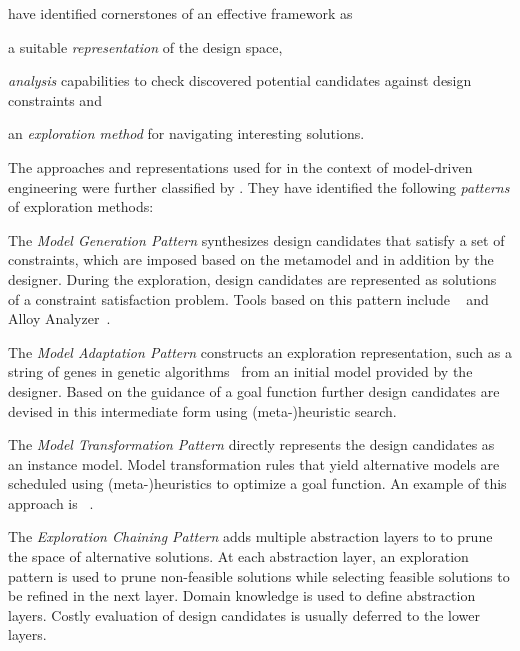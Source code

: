 \citet{Kang10effective} have identified cornerstones of an effective  framework as
\begin{inparaenum}
\item a suitable \emph{representation} of the design space,
\item \emph{analysis} capabilities to check discovered potential candidates against design constraints and
\item an \emph{exploration method} for navigating interesting solutions.
\end{inparaenum}
The approaches and representations used for  in the context of model-driven engineering were further classified by \citet{Vanherpen14patterns}. They have identified the following \emph{ patterns} of exploration methods:
\begin{itemize*}
\item The \emph{Model Generation Pattern} synthesizes design candidates that satisfy a set of constraints, which are imposed based on the metamodel and in addition by the designer. During the exploration, design candidates are represented as solutions of a constraint satisfaction problem. Tools based on this pattern include ~\citep{Kang10effective} and Alloy Analyzer~\citep{Jackson11abstractions}.
\item The \emph{Model Adaptation Pattern} constructs an exploration representation, such as a string of genes in genetic algorithms~ from an initial model provided by the designer. Based on the guidance of a goal function further design candidates are devised in this intermediate form using (meta-)heuristic search.
\item The \emph{Model Transformation Pattern} directly represents the design candidates as an instance model. Model transformation rules that yield alternative models are scheduled using (meta-)heuristics to optimize a goal function. An example of this approach is ~\citep{Hegedus13guided,Abdeen14multiobjective}.
\item The \emph{Exploration Chaining Pattern} adds multiple abstraction layers to  to prune the space of alternative solutions. At each abstraction layer, an exploration pattern is used to prune non-feasible solutions while selecting feasible solutions to be refined in the next layer. Domain knowledge is used to define abstraction layers. Costly evaluation of design candidates is usually deferred to the lower layers.
\end{itemize*}

